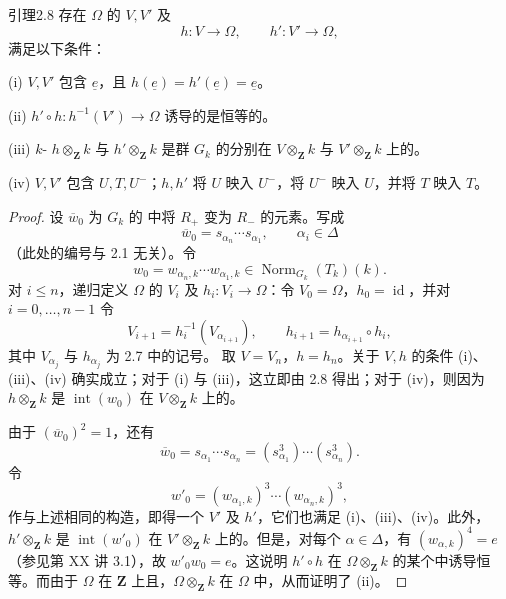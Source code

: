 \begin{SGAresult}{引理}{2.8}
存在 $\Omega$ 的 $V,V'$ 及
\[h:V\longrightarrow\Omega,\qquad h':V'\longrightarrow\Omega,\]
满足以下条件：

(i) $V,V'$ 包含 $\underline e$，且 $h(\underline e)=h'(\underline e)=\underline e$。

(ii) $h'\circ h:h^{-1}(V')\to\Omega$ 诱导的是恒等的。

(iii) $k$- $h\otimes_{\mathbf Z}k$ 与 $h'\otimes_{\mathbf Z}k$ 是群 $G_k$ 的分别在 $V\otimes_{\mathbf Z}k$ 与 $V'\otimes_{\mathbf Z}k$ 上的。

(iv) $V,V'$ 包含 $U,T,U^-$；$h,h'$ 将 $U$ 映入 $U^-$，将 $U^-$ 映入 $U$，并将 $T$ 映入 $T$。
\end{SGAresult}
\begin{proof}
设 $\overline w_0$ 为 $G_k$ 的 中将 $R_+$ 变为 $R_-$ 的元素。写成
\[\overline w_0=s_{\alpha_n}\cdots s_{\alpha_1},\qquad\alpha_i\in\Delta\]
（此处的编号与 2.1 无关）。令
\[w_0=w_{\alpha_n,k}\cdots w_{\alpha_1,k}\in\operatorname{Norm}_{G_k}(T_k)(k).\]
对 $i\leq n$，递归定义 $\Omega$ 的 $V_i$ 及 $h_i:V_i\to\Omega$：令 $V_0=\Omega$，$h_0=\operatorname{id}$，并对 $i=0,\ldots,n-1$ 令
\[V_{i+1}=h_i^{-1}(V_{\alpha_{i+1}}),\qquad h_{i+1}=h_{\alpha_{i+1}}\circ h_i,\]
其中 $V_{\alpha_j}$ 与 $h_{\alpha_j}$ 为 2.7 中的记号。
取 $V=V_n$，$h=h_n$。关于 $V,h$ 的条件 (i)、(iii)、(iv) 确实成立；对于 (i) 与 (iii)，这立即由 2.8 得出；对于 (iv)，则因为 $h\otimes_{\mathbf Z}k$ 是 $\operatorname{int}(w_0)$ 在 $V\otimes_{\mathbf Z}k$ 上的。

由于 $(\overline w_0)^2=1$，还有
\[\overline w_0=s_{\alpha_1}\cdots s_{\alpha_n}=(s_{\alpha_1}^{3})\cdots(s_{\alpha_n}^{3}).\]
令
\[w'_0=(w_{\alpha_1,k})^3\cdots(w_{\alpha_n,k})^3,\]
作与上述相同的构造，即得一个 $V'$ 及 $h'$，它们也满足 (i)、(iii)、(iv)。此外，$h'\otimes_{\mathbf Z}k$ 是 $\operatorname{int}(w'_0)$ 在 $V'\otimes_{\mathbf Z}k$ 上的。但是，对每个 $\alpha\in\Delta$，有 $(w_{\alpha,k})^4=e$（参见第 XX 讲 3.1），故 $w'_0w_0=e$。这说明 $h'\circ h$ 在 $\Omega\otimes_{\mathbf Z}k$ 的某个中诱导恒等。而由于 $\Omega$ 在 $\mathbf Z$ 上且，$\Omega\otimes_{\mathbf Z}k$ 在 $\Omega$ 中，从而证明了 (ii)。
\end{proof}

